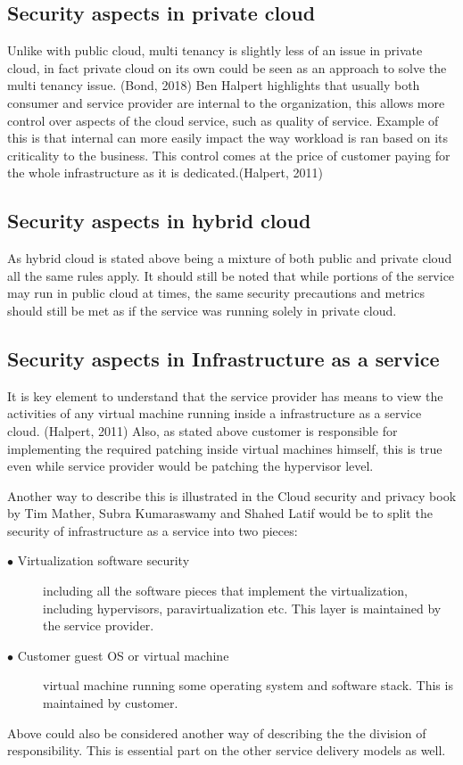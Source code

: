 \documentclass{article}
\begin{document}
\subsection{Security aspects in private cloud}
Unlike with public cloud, multi tenancy is slightly less of an issue in private cloud, in fact private cloud on its own could be seen as an approach to solve the multi tenancy issue. (Bond, 2018)
Ben Halpert highlights that usually both consumer and service provider are internal to the organization, this allows more control over aspects of the cloud service, such as quality of service.
Example of this is that internal can more easily impact the way workload is ran based on its criticality to the business. This control comes at the price of customer paying for the whole infrastructure as it is dedicated.(Halpert, 2011) 
\subsection{Security aspects in hybrid cloud}
As hybrid cloud is stated above being a mixture of both public and private cloud all the same rules apply. It should still be noted that while portions of the service may run in public cloud at times, the same security precautions and metrics should still be met as if the service was running solely in private cloud.
\subsection{Security aspects in Infrastructure as a service}
It is key element to understand that the service provider has means to view the activities of any virtual machine running inside a infrastructure as a service cloud. (Halpert, 2011)
Also, as stated above customer is responsible for implementing the required patching inside virtual machines himself, this is true even while service provider would be patching the hypervisor level.
\par
Another way to describe this is illustrated in the Cloud security and privacy book by Tim Mather, Subra Kumaraswamy and Shahed Latif would be to split the security of infrastructure as a service into two pieces:
\begin{description}
	\item[$\bullet$ Virtualization software security] including all the software pieces that implement the virtualization, including hypervisors, paravirtualization etc. This layer is maintained by the service provider.
	\item[$\bullet$ Customer guest OS or virtual machine] virtual machine running some operating system and software stack. This is maintained by customer.
\end{description}
Above could also be considered another way of describing the the division of responsibility. This is essential part on the other service delivery models as well.
\end{document}
